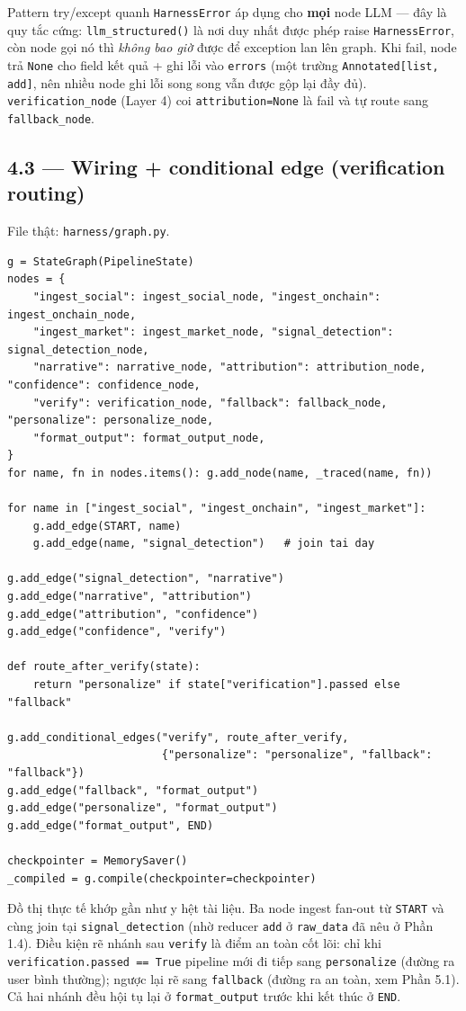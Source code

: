 \documentclass[12pt,a4paper]{article}
\newcommand{\file}[1]{\texttt{#1}}
\begin{document}
Pattern try/except quanh \texttt{HarnessError} áp dụng cho \textbf{mọi} node LLM --- đây là quy
tắc cứng: \texttt{llm\_structured()} là nơi duy nhất được phép raise \texttt{HarnessError}, còn
node gọi nó thì \emph{không bao giờ} được để exception lan lên graph. Khi fail, node trả
\texttt{None} cho field kết quả + ghi lỗi vào \texttt{errors} (một trường \texttt{Annotated[list,
add]}, nên nhiều node ghi lỗi song song vẫn được gộp lại đầy đủ). \texttt{verification\_node}
(Layer 4) coi \texttt{attribution=None} là fail và tự route sang \texttt{fallback\_node}.

\subsection{4.3 --- Wiring + conditional edge (verification routing)}

File thật: \file{harness/graph.py}.

\begin{lstlisting}
g = StateGraph(PipelineState)
nodes = {
    "ingest_social": ingest_social_node, "ingest_onchain": ingest_onchain_node,
    "ingest_market": ingest_market_node, "signal_detection": signal_detection_node,
    "narrative": narrative_node, "attribution": attribution_node, "confidence": confidence_node,
    "verify": verification_node, "fallback": fallback_node, "personalize": personalize_node,
    "format_output": format_output_node,
}
for name, fn in nodes.items(): g.add_node(name, _traced(name, fn))

for name in ["ingest_social", "ingest_onchain", "ingest_market"]:
    g.add_edge(START, name)
    g.add_edge(name, "signal_detection")   # join tai day

g.add_edge("signal_detection", "narrative")
g.add_edge("narrative", "attribution")
g.add_edge("attribution", "confidence")
g.add_edge("confidence", "verify")

def route_after_verify(state):
    return "personalize" if state["verification"].passed else "fallback"

g.add_conditional_edges("verify", route_after_verify,
                        {"personalize": "personalize", "fallback": "fallback"})
g.add_edge("fallback", "format_output")
g.add_edge("personalize", "format_output")
g.add_edge("format_output", END)

checkpointer = MemorySaver()
_compiled = g.compile(checkpointer=checkpointer)
\end{lstlisting}

Đồ thị thực tế khớp gần như y hệt tài liệu. Ba node ingest fan-out từ \texttt{START} và cùng join
tại \texttt{signal\_detection} (nhờ reducer \texttt{add} ở \texttt{raw\_data} đã nêu ở Phần 1.4).
Điều kiện rẽ nhánh sau \texttt{verify} là điểm an toàn cốt lõi: chỉ khi \texttt{verification.passed
== True} pipeline mới đi tiếp sang \texttt{personalize} (đường ra user bình thường); ngược lại rẽ
sang \texttt{fallback} (đường ra an toàn, xem Phần 5.1). Cả hai nhánh đều hội tụ lại ở
\texttt{format\_output} trước khi kết thúc ở \texttt{END}.
\end{document}

